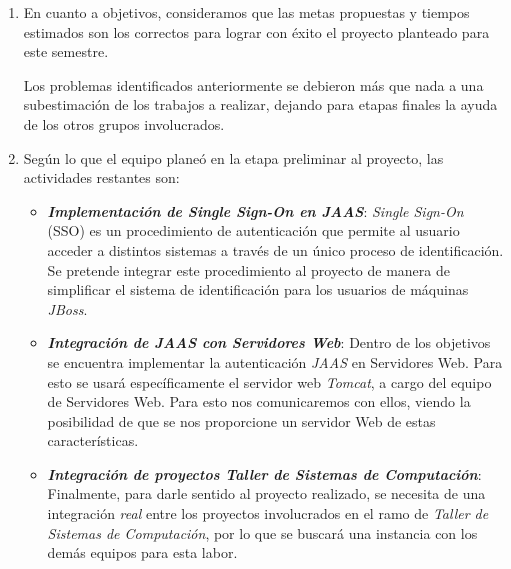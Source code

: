 
\begin{enumerate}
\item En cuanto a objetivos, consideramos que las metas propuestas y tiempos
estimados son los correctos para lograr con éxito el proyecto planteado
para este semestre.

Los problemas identificados anteriormente se debieron
más que nada a una subestimación de los trabajos a realizar, dejando para
etapas finales la ayuda de los otros grupos involucrados.\\


\item Según lo que el equipo planeó en la etapa preliminar al proyecto, las
actividades restantes son:
\begin{itemize}
	\item \emph{\textbf{Implementación de Single Sign-On en JAAS}}:
		\emph{Single Sign-On} (SSO) es un procedimiento de autenticación que
		permite al usuario acceder a distintos sistemas a través de un único
		proceso de identificación. Se pretende integrar este procedimiento al
		proyecto de manera de simplificar el sistema de identificación para los
		usuarios de máquinas \emph{JBoss}.
	\item \emph{\textbf{Integración de JAAS con Servidores Web}}:
		Dentro de los objetivos se encuentra implementar la autenticación 
		\emph{JAAS} en Servidores Web. Para esto se usará específicamente 
		el servidor web \emph{Tomcat}, a cargo del equipo de Servidores Web.
		Para esto nos comunicaremos con ellos, viendo la posibilidad de que
		se nos proporcione un servidor Web de estas características.
	\item \emph{\textbf{Integración de proyectos Taller de Sistemas
		de Computación}}: Finalmente, para darle sentido al proyecto realizado,
		se necesita de una integración \emph{real} entre los proyectos
		involucrados en el ramo de \emph{Taller de Sistemas de Computación}, 
		por lo que se buscará una instancia con los demás equipos para esta
		labor.
\end{itemize}
\end{enumerate}
